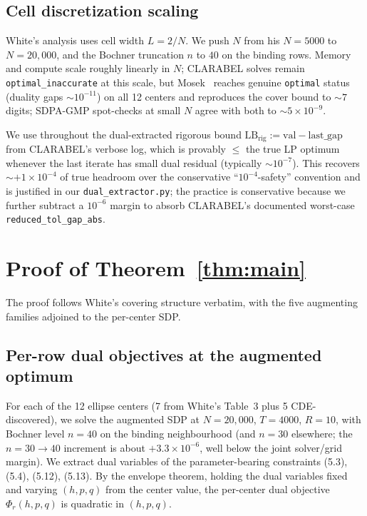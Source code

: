 \documentclass[11pt]{article}
\theoremstyle{plain}
\theoremstyle{definition}
\begin{document}
\subsection{Cell discretization scaling}\label{sec:scaling}

White's analysis uses cell width $L = 2/N$. We push $N$ from his
$N = 5000$ to $N = 20{,}000$, and the Bochner truncation $n$ to $40$
on the binding rows. Memory and compute scale roughly linearly in $N$;
CLARABEL solves remain \texttt{optimal\_inaccurate} at this scale, but
Mosek~\cite{MOSEK} reaches genuine \texttt{optimal} status (duality
gaps $\sim 10^{-11}$) on all 12 centers and reproduces the cover bound
to $\sim 7$ digits; SDPA-GMP spot-checks at small $N$ agree with both
to $\sim 5 \times 10^{-9}$.

We use throughout the dual-extracted rigorous bound
$\mathrm{LB}_{\text{rig}} := \mathrm{val} - \mathrm{last\_gap}$ from
CLARABEL's verbose log, which is provably $\le$ the true LP optimum
whenever the last iterate has small dual residual (typically $\sim
10^{-7}$). This recovers $\sim +1 \times 10^{-4}$ of true headroom
over the conservative ``$10^{-4}$-safety'' convention and is justified
in our \texttt{dual\_extractor.py}; the practice is conservative because
we further subtract a $10^{-6}$ margin to absorb CLARABEL's documented
worst-case \texttt{reduced\_tol\_gap\_abs}.

\section{Proof of Theorem~\ref{thm:main}}\label{sec:proof}

The proof follows White's covering structure verbatim, with the five
augmenting families adjoined to the per-center SDP.

\subsection{Per-row dual objectives at the augmented optimum}

For each of the 12 ellipse centers (7 from White's Table~3 plus 5
CDE-discovered), we solve the augmented SDP at $N = 20{,}000$,
$T = 4000$, $R = 10$, with Bochner level $n = 40$ on the binding
neighbourhood (and $n = 30$ elsewhere; the $n = 30 \to 40$ increment is
about $+3.3 \times 10^{-6}$, well below the joint solver/grid margin).
We extract dual variables of the parameter-bearing constraints
(5.3), (5.4), (5.12), (5.13). By the envelope theorem, holding the
dual variables fixed and varying $(h, p, q)$ from the center value,
the per-center dual objective $\Phi_r(h, p, q)$ is quadratic in
$(h, p, q)$.
\end{document}
